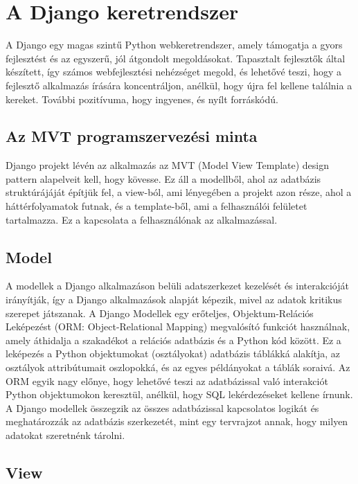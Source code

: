 \chapter{A Django keretrendszer}
\label{chap:intro}

A Django egy magas szintű Python webkeretrendszer, amely támogatja a gyors fejlesztést és az egyszerű, jól átgondolt megoldásokat. Tapasztalt fejlesztők által készített, így számos webfejlesztési nehézséget megold, és lehetővé teszi, hogy a fejlesztő alkalmazás írására koncentráljon, anélkül, hogy újra fel kellene találnia a kereket. További pozitívuma, hogy ingyenes, és nyílt forráskódú.\cite{Djangoproject}

\section{Az MVT programszervezési minta}

Django projekt lévén az alkalmazás az MVT (Model View Template) design pattern alapelveit kell, hogy kövesse. Ez áll a modellből, ahol az adatbázis struktúrájáját építjük fel, a view-ból, ami lényegében a projekt azon része, ahol a háttérfolyamatok futnak, és a template-ből, ami a felhasználói felületet tartalmazza. Ez a kapcsolata a felhasználónak az alkalmazással.

\section{Model}

A modellek a Django alkalmazáson belüli adatszerkezet kezelését és interakcióját irányítják, így a Django alkalmazások alapját képezik, mivel az adatok kritikus szerepet játszanak.
A Django Modellek egy erőteljes, Objektum-Relációs Leképezést (ORM: Object-Relational Mapping) megvalósító funkciót használnak, amely áthidalja a szakadékot a relációs adatbázis és a Python kód között. Ez a leképezés a Python objektumokat (osztályokat) adatbázis táblákká alakítja, az osztályok attribútumait oszlopokká, és az egyes példányokat a táblák soraivá.
Az ORM egyik nagy előnye, hogy lehetővé teszi az adatbázissal való interakciót Python objektumokon keresztül, anélkül, hogy SQL lekérdezéseket kellene írnunk.
A Django modellek összegzik az összes adatbázissal kapcsolatos logikát és meghatározzák az adatbázis szerkezetét, mint egy tervrajzot annak, hogy milyen adatokat szeretnénk tárolni.\cite{MVT_Design}

\section{View}

